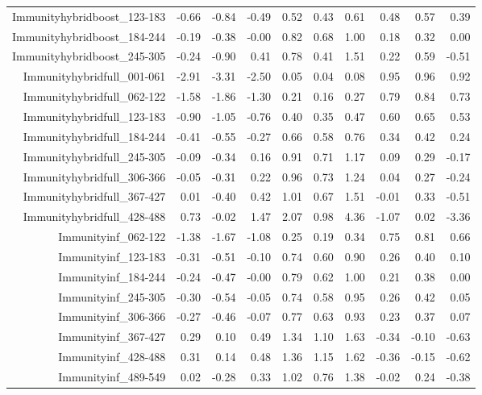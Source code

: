 \begin{table}[ht]
\begin{tabular}{rrrrrrrrrr}
  Immunityhybridboost\_123-183 & -0.66 & -0.84 & -0.49 & 0.52 & 0.43 & 0.61 & 0.48 & 0.57 & 0.39 \\ 
  Immunityhybridboost\_184-244 & -0.19 & -0.38 & -0.00 & 0.82 & 0.68 & 1.00 & 0.18 & 0.32 & 0.00 \\ 
  Immunityhybridboost\_245-305 & -0.24 & -0.90 & 0.41 & 0.78 & 0.41 & 1.51 & 0.22 & 0.59 & -0.51 \\ 
  Immunityhybridfull\_001-061 & -2.91 & -3.31 & -2.50 & 0.05 & 0.04 & 0.08 & 0.95 & 0.96 & 0.92 \\ 
  Immunityhybridfull\_062-122 & -1.58 & -1.86 & -1.30 & 0.21 & 0.16 & 0.27 & 0.79 & 0.84 & 0.73 \\ 
  Immunityhybridfull\_123-183 & -0.90 & -1.05 & -0.76 & 0.40 & 0.35 & 0.47 & 0.60 & 0.65 & 0.53 \\ 
  Immunityhybridfull\_184-244 & -0.41 & -0.55 & -0.27 & 0.66 & 0.58 & 0.76 & 0.34 & 0.42 & 0.24 \\ 
  Immunityhybridfull\_245-305 & -0.09 & -0.34 & 0.16 & 0.91 & 0.71 & 1.17 & 0.09 & 0.29 & -0.17 \\ 
  Immunityhybridfull\_306-366 & -0.05 & -0.31 & 0.22 & 0.96 & 0.73 & 1.24 & 0.04 & 0.27 & -0.24 \\ 
  Immunityhybridfull\_367-427 & 0.01 & -0.40 & 0.42 & 1.01 & 0.67 & 1.51 & -0.01 & 0.33 & -0.51 \\ 
  Immunityhybridfull\_428-488 & 0.73 & -0.02 & 1.47 & 2.07 & 0.98 & 4.36 & -1.07 & 0.02 & -3.36 \\ 
  Immunityinf\_062-122 & -1.38 & -1.67 & -1.08 & 0.25 & 0.19 & 0.34 & 0.75 & 0.81 & 0.66 \\ 
  Immunityinf\_123-183 & -0.31 & -0.51 & -0.10 & 0.74 & 0.60 & 0.90 & 0.26 & 0.40 & 0.10 \\ 
  Immunityinf\_184-244 & -0.24 & -0.47 & -0.00 & 0.79 & 0.62 & 1.00 & 0.21 & 0.38 & 0.00 \\ 
  Immunityinf\_245-305 & -0.30 & -0.54 & -0.05 & 0.74 & 0.58 & 0.95 & 0.26 & 0.42 & 0.05 \\ 
  Immunityinf\_306-366 & -0.27 & -0.46 & -0.07 & 0.77 & 0.63 & 0.93 & 0.23 & 0.37 & 0.07 \\ 
  Immunityinf\_367-427 & 0.29 & 0.10 & 0.49 & 1.34 & 1.10 & 1.63 & -0.34 & -0.10 & -0.63 \\ 
  Immunityinf\_428-488 & 0.31 & 0.14 & 0.48 & 1.36 & 1.15 & 1.62 & -0.36 & -0.15 & -0.62 \\ 
  Immunityinf\_489-549 & 0.02 & -0.28 & 0.33 & 1.02 & 0.76 & 1.38 & -0.02 & 0.24 & -0.38 \\ 

\end{tabular}
\end{table}
